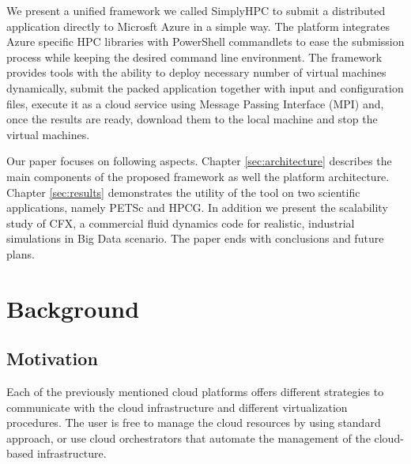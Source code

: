 \documentclass[3p,times]{elsarticle}
\begin{document}
We present a unified framework we called SimplyHPC to submit a distributed application directly to Microsft Azure in a simple way. The platform integrates Azure specific HPC libraries with PowerShell commandlets to ease the submission process while keeping the desired command line environment. The framework provides tools with the ability to deploy necessary number of virtual machines dynamically, submit the packed application together with input and configuration files, execute it as a cloud service using Message Passing Interface (MPI) and, once the results are ready, download them to the local machine and stop the virtual machines. 

Our paper focuses on following aspects. Chapter \ref{sec:architecture} describes the main components of the proposed framework as well the platform architecture. Chapter \ref{sec:results} demonstrates the utility of the tool on two scientific applications, namely PETSc and HPCG. In addition we present the scalability study of CFX, a commercial fluid dynamics code for realistic, industrial simulations in Big Data scenario. The paper ends with conclusions and future plans.




\section{Background}

\subsection{Motivation}

Each of the previously mentioned cloud platforms offers different strategies to communicate with the cloud infrastructure and different virtualization procedures. The user is free to manage the cloud resources by using standard approach, or use cloud orchestrators that automate the management of the cloud-based infrastructure. 
\end{document}
